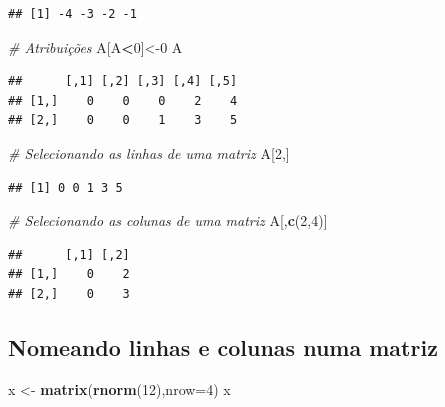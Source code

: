 \documentclass[
]{book}
\newenvironment{Shaded}{\begin{snugshade}}{\end{snugshade}}
\newcommand{\AttributeTok}[1]{\textcolor[rgb]{0.13,0.29,0.53}{#1}}
\newcommand{\CommentTok}[1]{\textcolor[rgb]{0.56,0.35,0.01}{\textit{#1}}}
\newcommand{\DecValTok}[1]{\textcolor[rgb]{0.00,0.00,0.81}{#1}}
\newcommand{\FunctionTok}[1]{\textcolor[rgb]{0.13,0.29,0.53}{\textbf{#1}}}
\newcommand{\NormalTok}[1]{#1}
\newcommand{\OtherTok}[1]{\textcolor[rgb]{0.56,0.35,0.01}{#1}}
\newcommand{\SpecialCharTok}[1]{\textcolor[rgb]{0.81,0.36,0.00}{\textbf{#1}}}
\begin{document}
\begin{verbatim}
## [1] -4 -3 -2 -1
\end{verbatim}

\begin{Shaded}
\begin{Highlighting}[]
\CommentTok{\# Atribuições}
\NormalTok{A[A}\SpecialCharTok{\textless{}}\DecValTok{0}\NormalTok{]}\OtherTok{\textless{}{-}}\DecValTok{0}
\NormalTok{A}
\end{Highlighting}
\end{Shaded}

\begin{verbatim}
##      [,1] [,2] [,3] [,4] [,5]
## [1,]    0    0    0    2    4
## [2,]    0    0    1    3    5
\end{verbatim}

\begin{Shaded}
\begin{Highlighting}[]
\CommentTok{\# Selecionando as linhas de uma matriz}
\NormalTok{A[}\DecValTok{2}\NormalTok{,]}
\end{Highlighting}
\end{Shaded}

\begin{verbatim}
## [1] 0 0 1 3 5
\end{verbatim}

\begin{Shaded}
\begin{Highlighting}[]
\CommentTok{\# Selecionando as colunas de uma matriz}
\NormalTok{A[,}\FunctionTok{c}\NormalTok{(}\DecValTok{2}\NormalTok{,}\DecValTok{4}\NormalTok{)] }
\end{Highlighting}
\end{Shaded}

\begin{verbatim}
##      [,1] [,2]
## [1,]    0    2
## [2,]    0    3
\end{verbatim}

\subsection{Nomeando linhas e colunas numa matriz}\label{nomeando-linhas-e-colunas-numa-matriz}

\begin{Shaded}
\begin{Highlighting}[]
\NormalTok{x }\OtherTok{\textless{}{-}} \FunctionTok{matrix}\NormalTok{(}\FunctionTok{rnorm}\NormalTok{(}\DecValTok{12}\NormalTok{),}\AttributeTok{nrow=}\DecValTok{4}\NormalTok{)}
\NormalTok{x}
\end{Highlighting}
\end{Shaded}
\end{document}
